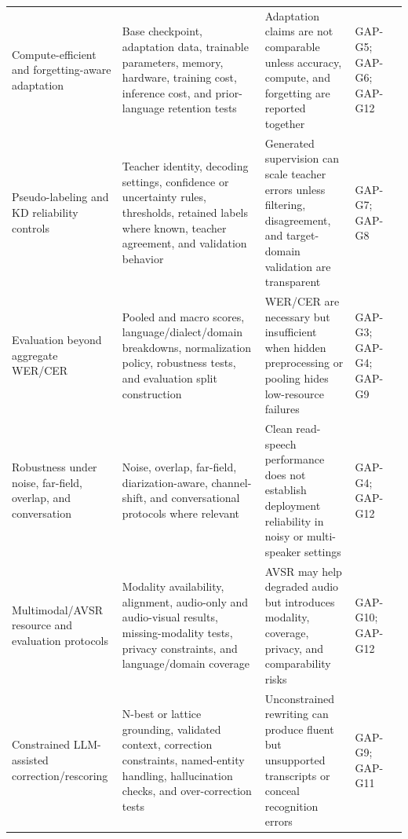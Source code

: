 \documentclass[pdflatex,sn-basic]{sn-jnl}
\theoremstyle{thmstyleone}
\theoremstyle{thmstyletwo}
\theoremstyle{thmstylethree}
\begin{document}
\begin{table}[htbp]
\begin{tabularx}{\textwidth}{YYYYY}
Compute-efficient and forgetting-aware adaptation & Base checkpoint, adaptation data, trainable parameters, memory, hardware, training cost, inference cost, and prior-language retention tests & Adaptation claims are not comparable unless accuracy, compute, and forgetting are reported together & GAP-G5; GAP-G6; GAP-G12 & \citep{getman24_interspeech,udupa24_interspeech,qian24_interspeech,feng2022superbslt} \\
Pseudo-labeling and KD reliability controls & Teacher identity, decoding settings, confidence or uncertainty rules, thresholds, retained labels where known, teacher agreement, and validation behavior & Generated supervision can scale teacher errors unless filtering, disagreement, and target-domain validation are transparent & GAP-G7; GAP-G8 & \citep{park20d_interspeech,khurana2020dust,leal21_interspeech,bhogale24_interspeech} \\
Evaluation beyond aggregate WER/CER & Pooled and macro scores, language/dialect/domain breakdowns, normalization policy, robustness tests, and evaluation split construction & WER/CER are necessary but insufficient when hidden preprocessing or pooling hides low-resource failures & GAP-G3; GAP-G4; GAP-G9 & \citep{shi2023mlsuperb,conneau2022fleurs,conneau2022xtreme_s,karita2023lenient} \\
Robustness under noise, far-field, overlap, and conversation & Noise, overlap, far-field, diarization-aware, channel-shift, and conversational protocols where relevant & Clean read-speech performance does not establish deployment reliability in noisy or multi-speaker settings & GAP-G4; GAP-G12 & \citep{watanabe2020chime6,cornell2023chime7} \\
Multimodal/AVSR resource and evaluation protocols & Modality availability, alignment, audio-only and audio-visual results, missing-modality tests, privacy constraints, and language/domain coverage & AVSR may help degraded audio but introduces modality, coverage, privacy, and comparability risks & GAP-G10; GAP-G12 & \citep{shi2022avhubert,shi2022robustavsr,anwar23_interspeech} \\
Constrained LLM-assisted correction/rescoring & N-best or lattice grounding, validated context, correction constraints, named-entity handling, hallucination checks, and over-correction tests & Unconstrained rewriting can produce fluent but unsupported transcripts or conceal recognition errors & GAP-G9; GAP-G11 & \citep{koenecke2024carelesswhisper,ma2024asrerrorcorrection,koudounas2025shallow,wang2025contextasrbench} \\

\end{tabularx}
\end{table}
\end{document}
